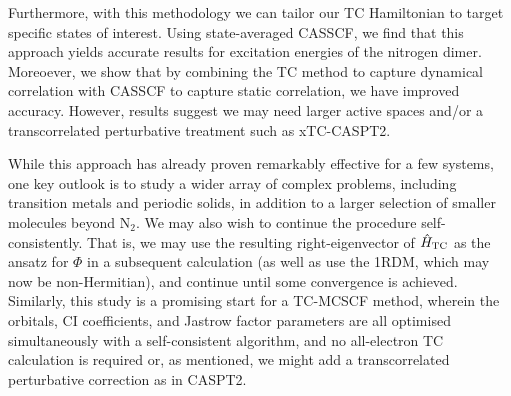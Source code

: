 Furthermore, with this methodology we can tailor our TC Hamiltonian to target specific states of interest. Using state-averaged CASSCF, we find that this approach yields accurate results for excitation energies of the nitrogen dimer. Moreoever, we show that by combining the TC method to capture dynamical correlation with CASSCF to capture static correlation, we have improved accuracy. However, results suggest we may need larger active spaces and/or a transcorrelated perturbative treatment such as xTC-\gls{CASPT2}.

While this approach has already proven remarkably effective for a few systems, one key outlook is to study a wider array of complex problems, including transition metals and periodic solids, in addition to a larger selection of smaller molecules beyond N$_2$. We may also wish to continue the procedure self-consistently. That is, we may use the resulting right-eigenvector of $\hat H_\mathrm{TC}$ as the ansatz for $\Phi$ in a subsequent calculation (as well as use the 1RDM, which may now be non-Hermitian), and continue until some convergence is achieved. Similarly, this study is a promising start for a \gls{TC}-\gls{MCSCF} method, wherein the orbitals, CI coefficients, and Jastrow factor parameters are all optimised simultaneously with a self-consistent algorithm, and no all-electron TC calculation is required or, as mentioned, we might add a transcorrelated perturbative correction as in \gls{CASPT2}.
